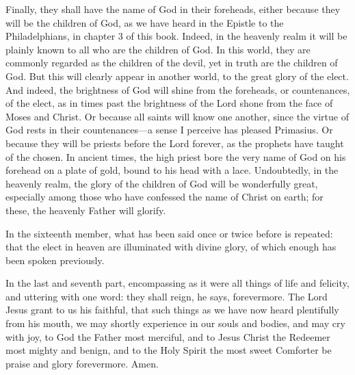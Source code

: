 Finally, they shall have the name of God in their foreheads, either because they will be the children of God, as we have heard in the Epistle to the Philadelphians, in chapter 3 of this book. Indeed, in the heavenly realm it will be plainly known to all who are the children of God. In this world, they are commonly regarded as the children of the devil, yet in truth are the children of God. But this will clearly appear in another world, to the great glory of the elect. And indeed, the brightness of God will shine from the foreheads, or countenances, of the elect, as in times past the brightness of the Lord shone from the face of Moses and Christ. Or because all saints will know one another, since the virtue of God rests in their countenances—a sense I perceive has pleased Primasius. Or because they will be priests before the Lord forever, as the prophets have taught of the chosen. In ancient times, the high priest bore the very name of God on his forehead on a plate of gold, bound to his head with a lace. Undoubtedly, in the heavenly realm, the glory of the children of God will be wonderfully great, especially among those who have confessed the name of Christ on earth; for these, the heavenly Father will glorify.

In the sixteenth member, what has been said once or twice before is repeated: that the elect in heaven are illuminated with divine glory, of which enough has been spoken previously.

In the last and seventh part, encompassing as it were all things of life and felicity, and uttering with one word: they shall reign, he says, forevermore. The Lord Jesus grant to us his faithful, that such things as we have now heard plentifully from his mouth, we may shortly experience in our souls and bodies, and may cry with joy, to God the Father most merciful, and to Jesus Christ the Redeemer most mighty and benign, and to the Holy Spirit the most sweet Comforter be praise and glory forevermore. Amen.
